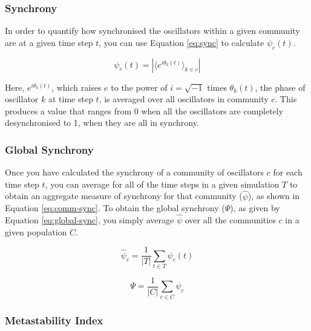 \documentclass[a4paper,11pt]{article}
\begin{document}
\subsubsection{Synchrony}
\label{sec:bg:sync}

In order to quantify how synchronised the oscillators within a given community are at a given time step $t$, you can use Equation \ref{eq:sync} to calculate $\psi_c(t)$\cite{Shanahan2010}. 

\begin{equation} \label{eq:sync}
\psi_c(t) = |\langle e^{i\theta_k(t)}\rangle_{k \in c}|
\end{equation}

Here, $e^{i\theta_k(t)}$, which raises $e$ to the power of $i = \sqrt{-1}$ times $\theta_k(t)$, the phase of oscillator $k$ at time step $t$, is averaged over all oscillators in community $c$. This produces a value that ranges from 0 when all the oscillators are completely desynchronised to 1, when they are all in synchrony.

\subsubsection{Global Synchrony}
\label{sec:bg:global-sync}

Once you have calculated the synchrony of a community of oscillators $c$ for each time step $t$, you can average for all of the time steps in a given simulation $T$ to obtain an aggregate measure of synchrony for that community ($\widehat{\psi}$), as shown in Equation \ref{eq:comm-sync}.  To obtain the global synchrony ($\Psi$), as given by Equation \ref{eq:global-sync}, you simply average $\widehat{\psi}$ over all the communities $c$ in a given population $C$.

\begin{equation} \label{eq:comm-sync}
\widehat{\psi}_c = \frac{1}{|T|} \sum_{t \in T} \psi_c(t)
\end{equation}

\begin{equation} \label{eq:global-sync}
\Psi = \frac{1}{|C|} \sum_{c \in C} \widehat{\psi}_c
\end{equation}
 
\subsubsection{Metastability Index}
\label{sec:bg:lambda}
\end{document}
